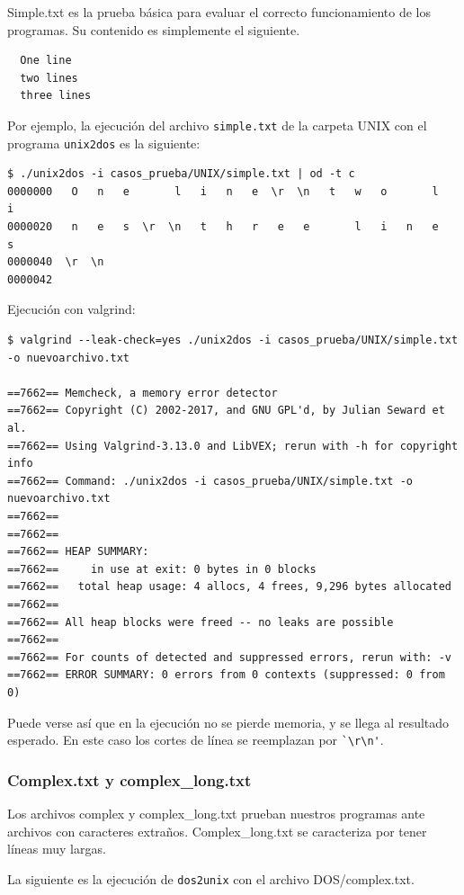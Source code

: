 \documentclass[a4paper,10pt, spanish]{article}
\begin{document}
Simple.txt es la prueba básica para evaluar el correcto funcionamiento de los programas.
Su contenido es simplemente el siguiente.

\begin{lstlisting}
  One line
  two lines
  three lines
\end{lstlisting}

Por ejemplo, la ejecución del archivo \lstinline{simple.txt} de la carpeta UNIX con el programa
\lstinline{unix2dos} es la siguiente:

\begin{lstlisting}
$ ./unix2dos -i casos_prueba/UNIX/simple.txt | od -t c
0000000   O   n   e       l   i   n   e  \r  \n   t   w   o       l   i
0000020   n   e   s  \r  \n   t   h   r   e   e       l   i   n   e   s
0000040  \r  \n
0000042
\end{lstlisting}
Ejecución con valgrind:
\begin{lstlisting}
$ valgrind --leak-check=yes ./unix2dos -i casos_prueba/UNIX/simple.txt -o nuevoarchivo.txt

==7662== Memcheck, a memory error detector
==7662== Copyright (C) 2002-2017, and GNU GPL'd, by Julian Seward et al.
==7662== Using Valgrind-3.13.0 and LibVEX; rerun with -h for copyright info
==7662== Command: ./unix2dos -i casos_prueba/UNIX/simple.txt -o nuevoarchivo.txt
==7662== 
==7662== 
==7662== HEAP SUMMARY:
==7662==     in use at exit: 0 bytes in 0 blocks
==7662==   total heap usage: 4 allocs, 4 frees, 9,296 bytes allocated
==7662== 
==7662== All heap blocks were freed -- no leaks are possible
==7662== 
==7662== For counts of detected and suppressed errors, rerun with: -v
==7662== ERROR SUMMARY: 0 errors from 0 contexts (suppressed: 0 from 0)
\end{lstlisting}

Puede verse así que en la ejecución no se pierde memoria, y se llega al resultado esperado.
En este caso los cortes de línea se reemplazan por \lstinline{`\r\n'}.

\subsubsection{Complex.txt y complex\_long.txt}

Los archivos complex y complex\_long.txt prueban nuestros programas ante archivos con caracteres
extraños. Complex\_long.txt se caracteriza por tener líneas muy largas.

La siguiente es la ejecución de \lstinline{dos2unix} con el archivo DOS/complex.txt. 
\end{document}
